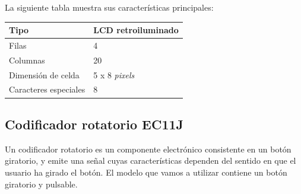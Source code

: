 \smallskip

La siguiente tabla muestra sus características principales:

\smallskip

\begin{center}
	\begin{tabular}{|l|l|}
		\hline Tipo & LCD retroiluminado \\ 
		\hline Filas & 4 \\ 
		\hline Columnas & 20 \\ 
		\hline Dimensión de celda & 5 x 8 \textit{pixels} \\ 
		\hline Caracteres especiales & 8 \\ 
		\hline 
	\end{tabular}
	\smallskip
\end{center} 

\smallskip

\subsection{Codificador rotatorio EC11J}

Un codificador rotatorio es un componente electrónico consistente en un botón giratorio, y emite una señal cuyas características dependen del sentido en que el usuario ha girado el botón. El modelo que vamos a utilizar contiene un botón giratorio y pulsable.

\smallskip

